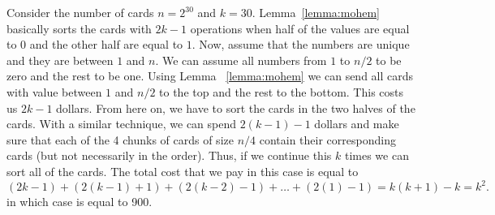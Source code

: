 \begin{solution}
Consider the number of cards $n=2^{30}$ and $k = 30$. Lemma~\ref{lemma:mohem} basically sorts the cards with $2k-1$ operations when half of the values are equal to $0$ and the other half are equal to $1$. Now, assume that the numbers are unique and they are between $1$ and $n$. We can assume all numbers from $1$ to $n/2$ to be zero and the rest to be one. Using Lemma ~\ref{lemma:mohem} we can send all cards with value between $1$ and $n/2$ to the top and the rest to the bottom. This costs us $2k-1$ dollars. From here on, we have to sort the cards in the two halves of the cards. With a similar technique, we can spend $2(k-1)-1$ dollars and make sure that each of the 4 chunks of cards of size $n/4$ contain their corresponding cards (but not necessarily in the order). Thus, if we continue this $k$ times we can sort all of the cards. The total cost that we pay in this case is equal to $$(2k-1) + (2(k-1)+1) + (2(k-2)-1) + \ldots + (2(1)-1) = k(k+1) - k = k^2.$$ in which case is equal to 900. 

\end{solution}

